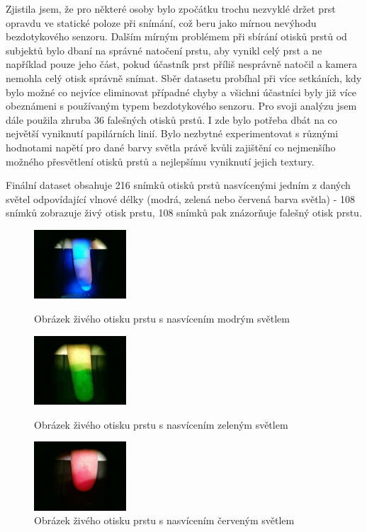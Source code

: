 Zjistila jsem, že pro některé osoby bylo zpočátku trochu nezvyklé držet prst opravdu ve statické poloze při snímání, což beru jako mírnou nevýhodu bezdotykového senzoru. Dalším mírným problémem při sbírání otisků prstů od subjektů bylo dbaní na správné natočení prstu, aby vynikl celý prst a ne například pouze jeho část, pokud účastník prst příliš nesprávně natočil a kamera nemohla celý otisk správně snímat. Sběr datasetu probíhal při více setkáních, kdy bylo možné co nejvíce eliminovat případné chyby a všichni účastníci byly již více obeznámeni s používaným typem bezdotykového senzoru. Pro svoji analýzu jsem dále použila zhruba 36 falešných otisků prstů. I zde bylo potřeba dbát na co největší vyniknutí papilárních linií. Bylo nezbytné experimentovat s různými hodnotami napětí pro dané barvy světla právě kvůli zajištění co nejmenšího možného přesvětlení otisků prstů a nejlepšímu vyniknutí jejich textury.

Finální dataset obsahuje 216 snímků otisků prstů nasvícenými jedním z daných světel odpovídající vlnové délky (modrá, zelená nebo červená barva světla) - 108 snímků zobrazuje živý otisk prstu, 108 snímků pak znázorňuje falešný otisk prstu.

\begin{figure}[!htbp]
  \begin{minipage}[b]{0.3\linewidth}
    \centering
    \includegraphics[width=130px]{obrazky-figures/live120.jpg}
    \caption{Obrázek živého otisku prstu s nasvícením modrým světlem}
  \end{minipage}
  \hspace{0.3cm}
  \begin{minipage}[b]{0.3\linewidth}
    \centering
    \includegraphics[width=130px]{obrazky-figures/live38.jpg}
    \caption{Obrázek živého otisku prstu s nasvícením zeleným světlem}
  \end{minipage}
  \hspace{0.3cm}
    \begin{minipage}[b]{0.3\linewidth}
    \centering
    \includegraphics[width=130px]{obrazky-figures/live56.jpg}
    \caption{Obrázek živého otisku prstu s nasvícením červeným světlem}
  \end{minipage}
\end{figure}

